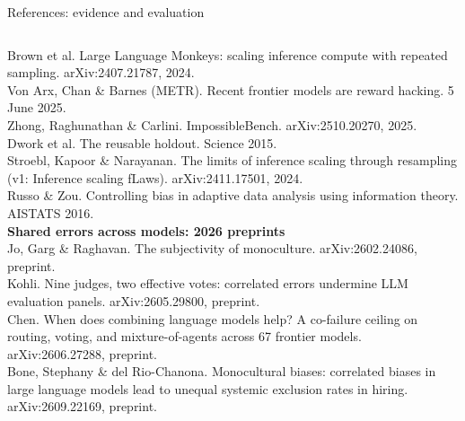\begin{frame}[t]{References: evidence and evaluation}
{\begin{columns}[T,onlytextwidth]
Brown et al. Large Language Monkeys: scaling inference compute with repeated sampling. arXiv:2407.21787, 2024.\\
Von Arx, Chan \& Barnes (METR). Recent frontier models are reward hacking. 5 June 2025.\\
Zhong, Raghunathan \& Carlini. ImpossibleBench. arXiv:2510.20270, 2025.\\
Dwork et al. The reusable holdout. Science 2015.\\
Stroebl, Kapoor \& Narayanan. The limits of inference scaling through resampling (v1: Inference scaling fLaws). arXiv:2411.17501, 2024.\\
Russo \& Zou. Controlling bias in adaptive data analysis using information theory. AISTATS 2016.\\
\textbf{Shared errors across models: 2026 preprints}\\
Jo, Garg \& Raghavan. The subjectivity of monoculture. arXiv:2602.24086, preprint.\\
Kohli. Nine judges, two effective votes: correlated errors undermine LLM evaluation panels. arXiv:2605.29800, preprint.\\
Chen. When does combining language models help? A co-failure ceiling on routing, voting, and mixture-of-agents across 67 frontier models. arXiv:2606.27288, preprint.\\
Bone, Stephany \& del Rio-Chanona. Monocultural biases: correlated biases in large language models lead to unequal systemic exclusion rates in hiring. arXiv:2609.22169, preprint.
\end{columns}\par}
\end{frame}
